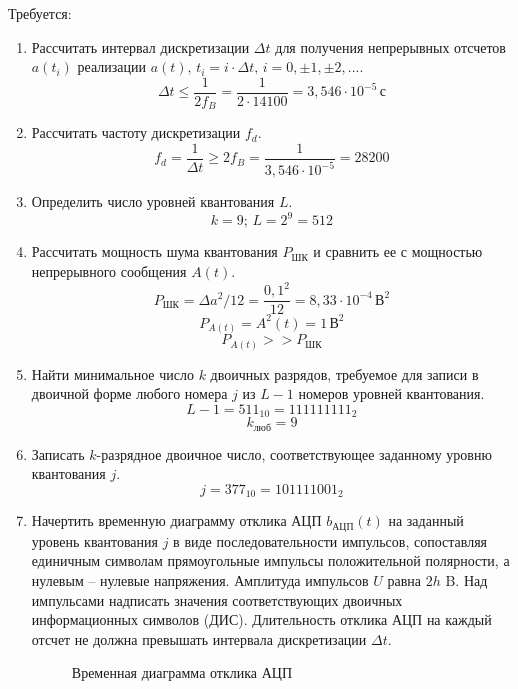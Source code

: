 \documentclass[a4paper, 12pt]{article}
\begin{document}
Требуется:
\begin{enumerate}
  \item Рассчитать интервал дискретизации $\Delta t$ для 
  получения непрерывных отсчетов $a(t_i)$ реализации 
  $a(t),\, t_i=i\cdot\Delta t,\, i=0,\pm1,\pm2,...$.
  \[ \Delta t \leq \frac{1}{2f_B}=\frac1 {2\cdot 14100} = 3,546\cdot 10^{-5}\, с \]
  \item Рассчитать частоту дискретизации $f_d$.
  \[ f_d=\frac{1}{\Delta t}\geq 2f_B=\frac{1}{3,546\cdot 10^{-5}}=28200 \]
  \item Определить число уровней квантования $L$.
  \[ k=9;\, L=2^9 = 512 \]
  \item Рассчитать мощность шума квантования $P_{ШК}$
  и сравнить ее с мощностью непрерывного сообщения $A(t)$.
  \[ P_{ШК}=\Delta a^2/12
  =\frac{0,1^2}{12}=8,33\cdot10^{-4}\, В^2 \]
  \[ P_{A(t)}=A^2(t)=1\, В^2\]
  \[ P_{A(t)} >> P_{ШК} \]
  \item Найти минимальное число $k$ двоичных разрядов, 
  требуемое для записи в двоичной форме любого номера $j$ 
  из $L-1$ номеров уровней квантования.
  \[ L-1=511_{10}=111111111_2 \]
  \[ k_{люб}=9 \]
  \item Записать $k$-разрядное двоичное число, 
  соответствующее заданному уровню квантования $j$.
  \[ j=377_{10}=101111001_2 \]
  \item Начертить временную диаграмму отклика АЦП 
  $b_{АЦП}(t)$ на заданный уровень квантования $j$ 
  в виде последовательности импульсов, 
  сопоставляя единичным символам прямоугольные импульсы 
  положительной полярности, а нулевым -- нулевые напряжения. 
  Амплитуда импульсов $U$ равна $2h$ B. Над импульсами 
  надписать значения соответствующих двоичных информационных 
  символов (ДИС). Длительность отклика АЦП на каждый отсчет 
  не должна превышать интервала дискретизации $\Delta t$.
  \begin{figure}[H]
    \centering
    \caption{Временная диаграмма отклика АЦП}
  \end{figure}
\end{enumerate}
\end{document}
